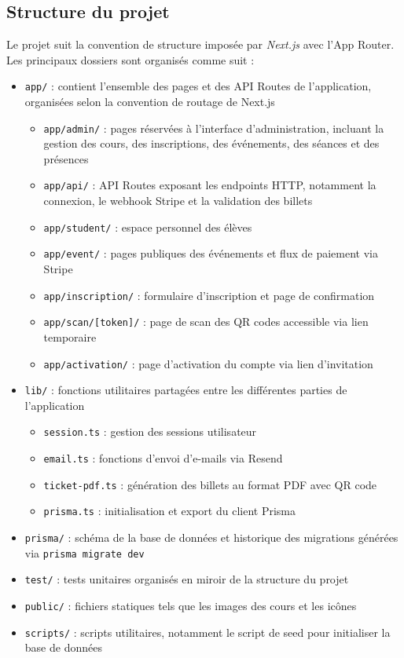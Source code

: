 \documentclass{article}
\begin{document}
\subsection{Structure du projet}

Le projet suit la convention de structure imposée par \textit{Next.js} 
avec l'App Router. Les principaux dossiers sont organisés comme suit :

\begin{itemize}
    \item \texttt{app/} : contient l'ensemble des pages et des 
    API Routes de l'application, organisées selon la convention 
    de routage de Next.js
    \begin{itemize}
        \item \texttt{app/admin/} : pages réservées à l'interface 
        d'administration, incluant la gestion des cours, des 
        inscriptions, des événements, des séances et des présences
        \item \texttt{app/api/} : API Routes exposant les endpoints 
        HTTP, notamment la connexion, le webhook Stripe et la 
        validation des billets
        \item \texttt{app/student/} : espace personnel des élèves
        \item \texttt{app/event/} : pages publiques des événements 
        et flux de paiement via Stripe
        \item \texttt{app/inscription/} : formulaire d'inscription 
        et page de confirmation
        \item \texttt{app/scan/[token]/} : page de scan des QR 
        codes accessible via lien temporaire
        \item \texttt{app/activation/} : page d'activation du 
        compte via lien d'invitation
    \end{itemize}
    \item \texttt{lib/} : fonctions utilitaires partagées entre 
    les différentes parties de l'application
    \begin{itemize}
        \item \texttt{session.ts} : gestion des sessions utilisateur
        \item \texttt{email.ts} : fonctions d'envoi d'e-mails via Resend
        \item \texttt{ticket-pdf.ts} : génération des billets au 
        format PDF avec QR code
        \item \texttt{prisma.ts} : initialisation et export du 
        client Prisma
    \end{itemize}
    \item \texttt{prisma/} : schéma de la base de données et 
    historique des migrations générées via \texttt{prisma migrate dev}
    \item \texttt{test/} : tests unitaires organisés en miroir 
    de la structure du projet
    \item \texttt{public/} : fichiers statiques tels que les 
    images des cours et les icônes
    \item \texttt{scripts/} : scripts utilitaires, notamment 
    le script de seed pour initialiser la base de données
\end{itemize}
\end{document}
